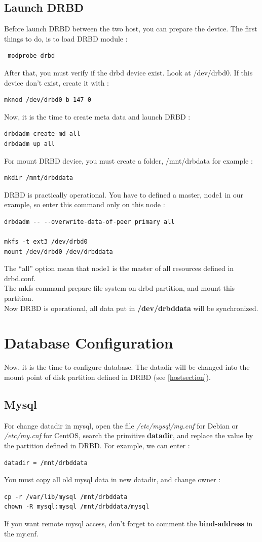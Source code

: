 \documentclass[a4paper,10pt]{report}
\begin{document}
\subsection{Launch DRBD}
Before launch DRBD between the two host, you can prepare the device. The first things to do, is to load DRBD module :
\begin{lstlisting}
 modprobe drbd
\end{lstlisting}
After that, you must verify if the drbd device exist. Look at /dev/drbd0. If this device don't exist, create it with :
\begin{lstlisting}
mknod /dev/drbd0 b 147 0
\end{lstlisting}
Now, it is the time to create meta data and launch DRBD :
\begin{lstlisting}
drbdadm create-md all
drbdadm up all
\end{lstlisting}
For mount DRBD device, you must create a folder, /mnt/drbdata for example :
\begin{lstlisting}
mkdir /mnt/drbddata
\end{lstlisting}
DRBD is practically operational. You have to defined a master, node1 in our example, so enter this command only on this node :
\begin{lstlisting}
drbdadm -- --overwrite-data-of-peer primary all

mkfs -t ext3 /dev/drbd0
mount /dev/drbd0 /dev/drbddata
\end{lstlisting}
The ``all'' option mean that node1 is the master of all resources defined in drbd.conf.\\
The mkfs command prepare file system on drbd partition, and mount this partition.\\
Now DRBD is operational, all data put in \textbf{/dev/drbddata} will be synchronized.




\section{Database Configuration}
Now, it is the time to configure database. The datadir will be changed into the  mount point of disk partition defined in DRBD (see  \ref{hostsection}).

\subsection{Mysql}
For change datadir in mysql, open the file \textit{/etc/mysql/my.cnf} for Debian or \textit{/etc/my.cnf} for CentOS, search the primitive \textbf{datadir}, and replace the value by the partition defined in DRBD.
For example, we can enter :
\begin{lstlisting}
datadir = /mnt/drbddata
\end{lstlisting}
You must copy all old mysql data in new datadir, and change owner :
\begin{lstlisting}
cp -r /var/lib/mysql /mnt/drbddata
chown -R mysql:mysql /mnt/drbddata/mysql
\end{lstlisting}
If you want remote mysql access, don't forget to comment the \textbf{bind-address} in the my.cnf.\\
\end{document}
